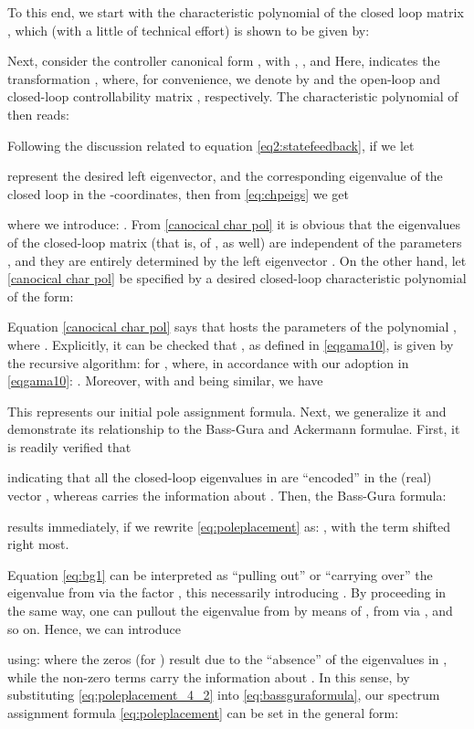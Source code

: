 \documentclass[conference]{IEEEtran}
\begin{document}
To this end, we start with the characteristic polynomial of the {closed loop} matrix , which (with a little of technical effort) is shown to be given by:

Next, consider the controller canonical form , with ,  , and 
Here,  \cite{Kailat80} indicates the transformation , where, for convenience, we denote by
 and  the
open-loop and closed-loop controllability matrix \cite{Kailat80}, respectively.
The characteristic polynomial of  then reads:

Following the discussion related to equation \eqref{eq2:statefeedback}, if we let

represent the desired left eigenvector, and  the corresponding eigenvalue of the closed loop
 in the -coordinates, then from \eqref{eq:chpeigs} we get

where we introduce:
.
From \eqref{canocical char pol} it is obvious that the eigenvalues  of the closed-loop matrix  (that is, of  , as well) are independent of the parameters , and they are entirely determined by the left eigenvector . On the other hand, let \eqref{canocical char pol}  be specified by a desired closed-loop characteristic polynomial of the form:

Equation \eqref{canocical char pol} says that  hosts the parameters of the polynomial , where
. Explicitly, it
can be checked that , as defined in \eqref{eqgama10}, is given by the recursive algorithm:
 for ,
where, in accordance with our adoption in \eqref{eqgama10}: . Moreover, with  and  being similar, we have



This represents our initial pole assignment formula. Next, we
generalize it and demonstrate its relationship to the Bass-Gura and
Ackermann formulae. First, it is readily verified that
\vspace{-10pt}

indicating that all the closed-loop eigenvalues in  are ``encoded'' in the (real) vector , whereas  carries the information about . Then, the Bass-Gura formula:

results immediately, if we rewrite \eqref{eq:poleplacement} as:
,
with the term  shifted right most. 

Equation \eqref{eq:bg1} can be interpreted as ``pulling out'' or ``carrying over'' the eigenvalue  from  via the factor , this necessarily introducing . By proceeding in the same way, one can pullout the eigenvalue  from  by means of ,  from  via , and so on. Hence, we can introduce

using: 
where the  zeros (for ) result due to the ``absence''
of the eigenvalues  in ,
while the  non-zero terms carry the information about .
In this sense, by substituting \eqref{eq:poleplacement_4_2} into  \eqref{eq:bassguraformula}, our spectrum assignment formula \eqref{eq:poleplacement} can be set in the general form:
\end{document}
